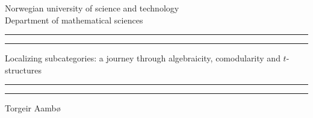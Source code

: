 
\begin{titlingpage}



    \vspace*{5cm}
    \begin{center}
	Norwegian university of science and 		technology \\
	Department of mathematical sciences 
    \vspace{-1em}
	\end{center}
    \rule[-11pt]{\textwidth}{1pt}
    \rule{\textwidth}{0.5pt}

    \begin{center}
    \Huge Localizing subcategories: a journey through algebraicity, comodularity and $t$-structures
    \end{center}

    \rule{\textwidth}{0.5pt}
    \rule[11pt]{\textwidth}{1pt}


    \begin{center}
    Torgeir Aambø
    \end{center}



    \vspace{\fill}



\end{titlingpage}